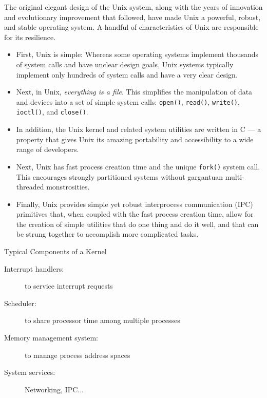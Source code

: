The original elegant design of the Unix system, along with the years of innovation and
evolutionary improvement that followed, have made Unix a powerful, robust, and stable
operating system. A handful of characteristics of Unix are responsible for its
resilience. 

\begin{itemize}
\item First, Unix is simple: Whereas some operating systems implement thousands of system
  calls and have unclear design goals, Unix systems typically implement only hundreds of
  system calls and have a very clear design.
\item Next, in Unix, \emph{everything is a file}. This simplifies the manipulation of data
  and devices into a set of simple system calls: \texttt{open()}, \texttt{read()},
  \texttt{write()}, \texttt{ioctl()}, and \texttt{close()}.
\item In addition, the Unix kernel and related system utilities are written in C --- a
  property that gives Unix its amazing portability and accessibility to a wide range of
  developers.
\item Next, Unix has fast process creation time and the unique \texttt{fork()} system
  call. This encourages strongly partitioned systems without gargantuan multi-threaded
  monstrosities.
\item Finally, Unix provides simple yet robust interprocess communication (IPC) primitives
  that, when coupled with the fast process creation time, allow for the creation of simple
  utilities that do one thing and do it well, and that can be strung together to
  accomplish more complicated tasks.
\end{itemize}

\begin{frame}
  \begin{block}{Typical Components of a Kernel}
    \begin{description}
    \item[Interrupt handlers:] to service interrupt requests
    \item[Scheduler:] to share processor time among multiple processes
    \item[Memory management system:] to manage process address spaces
    \item[System services:] Networking, IPC...
    \end{description}
  \end{block}
\end{frame}

